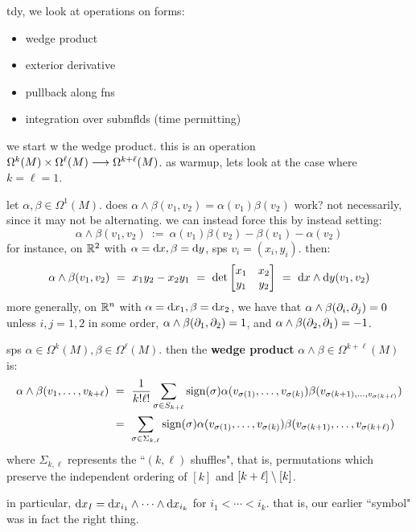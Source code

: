 tdy, we look at operations on forms:
\begin{itemize}
	\item wedge product
	\item exterior derivative
	\item pullback along fns
	\item integration over submflds (time permitting)
\end{itemize}

we start w the wedge product.
this is an operation $\Omega^{k}(M)\times\Omega^{\ell}(M)\longrightarrow\Omega^{k+\ell}(M)$.
as warmup, lets look at the case where $k=\ell=1$.

let $\alpha,\beta\in\Omega^{1}(M)$.
does $\alpha\wedge\beta(v_{1},v_{2})=\alpha(v_{1})\beta(v_{2})$ work?
not necessarily, since it may not be alternating.
we can instead force this by instead setting:
\begin{equation*}
	\alpha\wedge\beta(v_{1},v_{2}) \ := \ \alpha(v_{1})\beta(v_{2})-\beta(v_{1})-\alpha(v_{2})
\end{equation*}
for instance, on $\mathbb{R}^{2}$ with $\alpha=\textrm{d} x,\beta=\textrm{d} y$, sps $v_{i}=(x_{i},y_{i})$. then:
\begin{equation*}
	\alpha\wedge\beta(v_{1},v_{2}) \ = \ x_{1}y_{2}-x_{2}y_{1}
	\ = \ \det\begin{bmatrix} x_{1} & x_{2} \\ y_{1} & y_{2} \end{bmatrix}
	\ = \ \d x\wedge\d y(v_{1},v_{2})
\end{equation*}
more generally, on $\mathbb{R}^{n}$ with $\alpha=\textrm{d} x_{1},\beta=\textrm{d} x_{2}$, we have that
$\alpha\wedge\beta(\partial_{i},\partial_{j})=0$ unless $i,j=1,2$ in some order,
$\alpha\wedge\beta(\partial_{1},\partial_{2})=1$, and $\alpha\wedge\beta(\partial_{2},\partial_{1})=-1$.

\begin{defn}
	sps $\alpha\in\Omega^{k}(M),\beta\in\Omega^{\ell}(M)$.
then the \textbf{wedge product} $\alpha\wedge\beta\in\Omega^{k+\ell}(M)$ is: \vspace{-0.1in}
	\begin{align*}
		\alpha\wedge\beta(v_{1},\dots,v_{k+\ell})
		& \ = \ \frac{1}{k!\ell!} \sum_{\sigma\in S_{k+\ell}} \textrm{sign}(\sigma)
		\alpha(v_{\sigma(1)},\dots,v_{\sigma(k)})
		\beta(v_{\sigma(k+1),\dots,v_{\sigma(k+\ell)}}) \\
		& \ = \ \sum_{\sigma\in\Sigma_{k,\ell}}\textrm{sign}(\sigma)
		\alpha(v_{\sigma(1)},\dots,v_{\sigma(k)})
		\beta(v_{\sigma(k+1)},\dots,v_{\sigma(k+\ell)})
	\end{align*}
	where $\Sigma_{k,\ell}$ represents the ``$(k,\ell)$ shuffles", that is,
	permutations which preserve the independent ordering of $[k]$ and
	$[k+\ell]\setminus[k]$.
\end{defn}
in particular, $\textrm{d} x_{I}=\textrm{d} x_{i_{1}}\wedge\cdots\wedge\textrm{d} x_{i_{k}}$ for
$i_{1}<\cdots<i_{k}$.
that is, our earlier ``symbol" was in fact the right thing.

